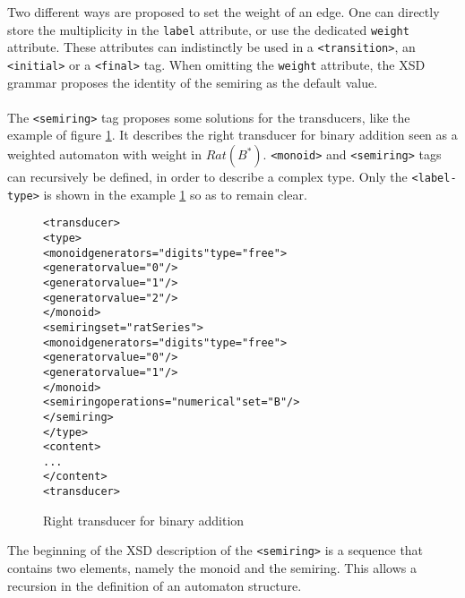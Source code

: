 \documentclass[a4paper]{llncs}
\def\typetag{\texttt{<label-type>}}
\def\dstname{\texttt{dst}}
\def\srcname{\texttt{src}}
\def\transitiontag{\texttt{<transition>}}
\def\finaltag{\texttt{<final>}}
\def\initialtag{\texttt{<initial>}}
\def\monoidtag{\texttt{<monoid>}}
\def\semiringtag{\texttt{<semiring>}}
\begin{document}
Two different ways are proposed to set the weight of an edge. One can
directly store the multiplicity in the \verb|label| attribute, or use
the dedicated \verb|weight| attribute. These attributes can
indistinctly be used in a \transitiontag{}, an
\initialtag{} or a \finaltag{} tag. When omitting the
\verb|weight| attribute, the XSD grammar proposes the identity of
the semiring as the default value.\\\\


The \semiringtag{} tag proposes some solutions for the transducers, like the
example of figure \ref{ratseries1}. It describes the right transducer
for binary addition seen as a weighted automaton with
weight in $Rat(B^*)$. \monoidtag{} and \semiringtag{} tags can recursively be
defined, in order to describe a complex type. Only the \typetag{} is shown in
the example \ref{ratseries1} so as to remain clear.

\begin{figure}[h]
  \begin{center}
\begin{alltt}
<transducer>
  <type>
    <monoid generators="digits" type="free">
      <generator value="0"/>
      <generator value="1"/>
      <generator value="2"/>
    </monoid>
    <semiring set="ratSeries">
      <monoid generators="digits" type="free">
        <generator value="0"/>
        <generator value="1"/>
      </monoid>
      <semiring operations="numerical" set="B"/>
    </semiring>
  </type>
  <content>
    ...
  </content>
<transducer>
\end{alltt}

\caption{Right transducer for binary addition}
\label{ratseries1}
  \end{center}
\end{figure}

The beginning of the XSD description of the \semiringtag{} is a sequence that
contains two elements, namely the monoid and the semiring. This allows a
recursion in the definition of an automaton structure.

\end{document}
